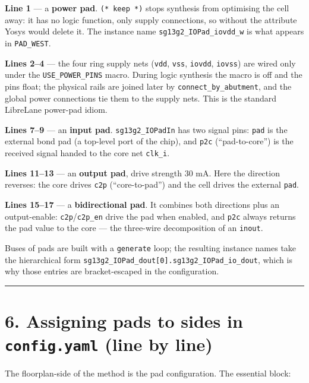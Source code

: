 \documentclass[
  11pt,
  a4paper,
]{article}
\begin{document}
\textbf{Line 1} --- a \textbf{power pad}. \texttt{(*\ keep\ *)} stops
synthesis from optimising the cell away: it has no logic function, only
supply connections, so without the attribute Yosys would delete it. The
instance name \texttt{sg13g2\_IOPad\_iovdd\_w} is what appears in
\texttt{PAD\_WEST}.

\textbf{Lines 2--4} --- the four ring supply nets (\texttt{vdd},
\texttt{vss}, \texttt{iovdd}, \texttt{iovss}) are wired only under the
\texttt{USE\_POWER\_PINS} macro. During logic synthesis the macro is off
and the pins float; the physical rails are joined later by
\texttt{connect\_by\_abutment}, and the global power connections tie
them to the supply nets. This is the standard LibreLane power-pad idiom.

\textbf{Lines 7--9} --- an \textbf{input pad}. \texttt{sg13g2\_IOPadIn}
has two signal pins: \texttt{pad} is the external bond pad (a top-level
port of the chip), and \texttt{p2c} (``pad-to-core'') is the received
signal handed to the core net \texttt{clk\_i}.

\textbf{Lines 11--13} --- an \textbf{output pad}, drive strength 30 mA.
Here the direction reverses: the core drives \texttt{c2p}
(``core-to-pad'') and the cell drives the external \texttt{pad}.

\textbf{Lines 15--17} --- a \textbf{bidirectional pad}. It combines both
directions plus an output-enable: \texttt{c2p}/\texttt{c2p\_en} drive
the pad when enabled, and \texttt{p2c} always returns the pad value to
the core --- the three-wire decomposition of an \texttt{inout}.

Buses of pads are built with a \texttt{generate} loop; the resulting
instance names take the hierarchical form
\texttt{sg13g2\_IOPad\_dout{[}0{]}.sg13g2\_IOPad\_io\_dout}, which is
why those entries are bracket-escaped in the configuration.

\begin{center}\rule{0.5\linewidth}{0.5pt}\end{center}

\hypertarget{assigning-pads-to-sides-in-config.yaml-line-by-line}{%
\section{\texorpdfstring{6. Assigning pads to sides in
\texttt{config.yaml} (line by
line)}{6. Assigning pads to sides in config.yaml (line by line)}}\label{assigning-pads-to-sides-in-config.yaml-line-by-line}}

The floorplan-side of the method is the pad configuration. The essential
block:
\end{document}
